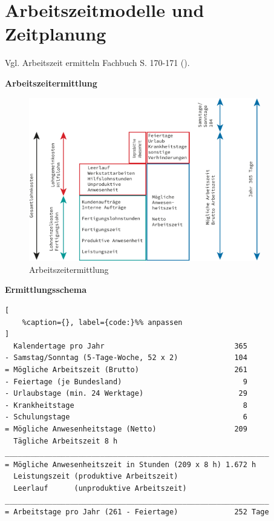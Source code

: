 \section{Arbeitszeitmodelle und
Zeitplanung}\label{arbeitszeitmodelle-und-zeitplanung}

Vgl. Arbeitszeit ermitteln Fachbuch S. 170-171
(\textcite{heiser:2017:betriebsfuhrung}).

\textbf{Arbeitszeitermittlung}

\begin{figure}[!ht]%
\centering
\includegraphics[width=0.9\textwidth]{images/Skizze/Arbeitszeitermittlung.pdf}
\caption{Arbeitszeitermittlung}
\end{figure}

\textbf{Ermittlungsschema}

\lstset{language=Python}%
\begin{lstlisting}[
	%caption={}, label={code:}%% anpassen
]
  Kalendertage pro Jahr                              365
- Samstag/Sonntag (5-Tage-Woche, 52 x 2)             104
= Mögliche Arbeitszeit (Brutto)                      261
- Feiertage (je Bundesland)                            9
- Urlaubstage (min. 24 Werktage)                      29
- Krankheitstage                                       8
- Schulungstage                                        6 
= Mögliche Anwesenheitstage (Netto)                  209
  Tägliche Arbeitszeit 8 h 
_____________________________________________________________
= Mögliche Anwesenheitszeit in Stunden (209 x 8 h) 1.672 h
  Leistungszeit (produktive Arbeitszeit)
  Leerlauf      (unproduktive Arbeitszeit)
_____________________________________________________________
= Arbeitstage pro Jahr (261 - Feiertage)             252 Tage
\end{lstlisting}

